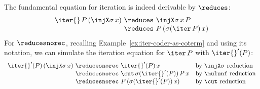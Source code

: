 \begin{example}
The fundamental equation for iteration is indeed derivable by $\reduces$:
\[
\begin{array}{r@{\ \reduces\ }l}
     \iter{}\, P\, (\injX\sigma\, x) & \injX \sigma \, x\, P  \\
     & P\, (\sigma(\iter\, P)\, x)
\end{array}
\]
For $\reducesnorec$, recalling Example~\ref{ex:iter-coder-as-coterm} and using its notation,
we can simulate the iteration equation for $\iter\, P$ with $\iter{}'(P)$:
\[
\begin{array}{r@{\ \reducesnorec\ }ll}
     \iter{}'(P)\, (\injX\sigma\, x) & \iter{}'(P)\, x & \text{by $\injX\sigma$ reduction} \\
     & \cut\, \sigma(\iter{}'(P))\, P\, x & \text{by $\mulunf$ reduction} \\
     & P\, (\sigma(\iter{}'(P))\, x) & \text{by $\cut$ reduction}
\end{array}
\]
\end{example}


